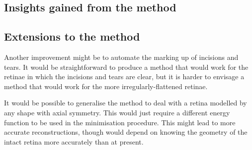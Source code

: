 \documentclass[10pt]{article}
\begin{document}
\subsection*{Insights gained from the method}


\subsection*{Extensions to the method}

Another improvement might be to automate the marking up of incisions
and tears. It would be straightforward to produce a method that would
work for the retinae in which the incisions and tears are clear, but
it is harder to envisage a method that would work for the more
irregularly-flattened retinae.

It would be possible to generalise the method to deal with a retina
modelled by any shape with axial symmetry. This would just require a
different energy function to be used in the minimisation
procedure. This might lead to more accurate reconstructions, though
would depend on knowing the geometry of the intact retina more
accurately than at present.






\end{document}
